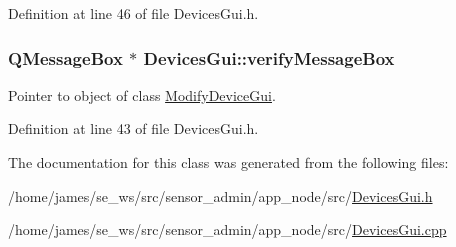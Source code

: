 Definition at line 46 of file Devices\-Gui.\-h.

\hypertarget{class_devices_gui_aae408c61187cf1ace6291cc2f726546b}{
\subsubsection[{verify\-Message\-Box}]{\setlength{\rightskip}{0pt plus 5cm}Q\-Message\-Box $\ast$ Devices\-Gui\-::verify\-Message\-Box\hspace{0.3cm}{\ttfamily [private]}}}\label{class_devices_gui_aae408c61187cf1ace6291cc2f726546b}
Pointer to object of class \hyperlink{class_modify_device_gui}{Modify\-Device\-Gui}. 

Definition at line 43 of file Devices\-Gui.\-h.



The documentation for this class was generated from the following files\-:\begin{DoxyCompactItemize}
\item 
/home/james/se\-\_\-ws/src/sensor\-\_\-admin/app\-\_\-node/src/\hyperlink{app__node_2src_2_devices_gui_8h}{Devices\-Gui.\-h}\item 
/home/james/se\-\_\-ws/src/sensor\-\_\-admin/app\-\_\-node/src/\hyperlink{app__node_2src_2_devices_gui_8cpp}{Devices\-Gui.\-cpp}\end{DoxyCompactItemize}
